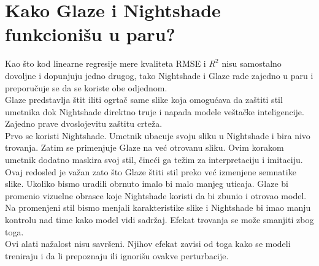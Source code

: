\section{Kako Glaze i Nightshade funkcionišu u paru?}
Kao što kod linearne regresije mere kvaliteta RMSE i $R^2$ nisu samostalno dovoljne i dopunjuju jedno drugog, tako Nightshade i Glaze rade zajedno u paru i preporučuje se da se koriste obe odjednom. \\
Glaze predstavlja štit iliti ogrtač same slike koja omogućava da zaštiti stil umetnika dok Nightshade direktno truje i napada modele veštačke inteligencije. Zajedno prave dvoslojevitu zaštitu crteža. \\
Prvo se koristi Nightshade. Umetnik ubacuje svoju sliku u Nightshade i bira nivo trovanja. Zatim se primenjuje Glaze na već otrovanu sliku. Ovim korakom umetnik dodatno maskira svoj stil, čineći ga težim za interpretaciju i imitaciju. Ovaj redosled je važan zato što Glaze štiti stil preko već izmenjene semnatike slike. Ukoliko bismo uradili obrnuto imalo bi malo manjeg uticaja. Glaze bi promenio vizuelne obrasce koje Nightshade koristi da bi zbunio i otrovao model. Na promenjeni stil bismo menjali karakteristike slike i Nightshade bi imao manju kontrolu nad time kako model vidi sadržaj. Efekat trovanja se može smanjiti zbog toga. \\
Ovi alati nažalost nisu savršeni. Njihov efekat zavisi od toga kako se modeli treniraju i da li prepoznaju ili ignorišu ovakve perturbacije. 

